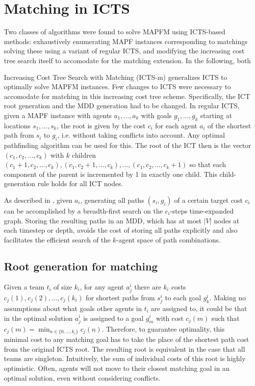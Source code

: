 \documentclass[english]{article}
\begin{document}
	\section{Matching in ICTS} %
	Two classes of algorithms were found to solve MAPFM using ICTS-based methods: exhaustively enumerating MAPF instances corresponding to matchings solving these using a variant of regular ICTS, and modifying the increasing cost tree search itself to accomodate for the matching extension. In the following, both 
	
	
	
	Increasing Cost Tree Search with Matching (ICTS-m) generalizes ICTS to optimally solve MAPFM instances. Few changes to ICTS were necessary to accomodate for matching in this increasing cost tree scheme. Specifically, the ICT root generation and the MDD generation had to be changed. In regular ICTS, given a MAPF instance with agents $a_1,\ldots,a_k$ with goals $g_1,\ldots,g_k$ starting at locations $s_1,\ldots,s_k$, the root is given by the cost $c_i$ for each agent $a_i$ of the shortest path from $s_i$ to $g_i$, i.e. without taking conflicts into account. Any optimal pathfinding algorithm can be used for this. The root of the ICT then is the vector $(c_1,c_2,\ldots,c_k)$ with $k$ children $(c_1 + 1, c_2,\ldots,c_k), (c_1, c_2 + 1,\ldots,c_k),\ldots,(c_1, c_2,\ldots,c_k + 1)$ so that each component of the parent is incremented by 1 in exactly one child. This child-generation rule holds for all ICT nodes. 
	
	As described in \cite{sharon2011}, given $a_i$, generating all paths $(s_i,g_i)$ of a certain target cost $c_i$ can be accomplished by a breadth-first search on the $c_i$-steps time-expanded graph. Storing the resulting paths in an MDD, which has at most $|V|$ nodes at each timestep or depth, avoids the cost of storing all paths explicitly and also facilitates the efficient search of the $k$-agent space of path combinations.
	\subsection{Root generation for matching}
	Given a team $t_i$ of size $k_i$, for any agent $a_j^i$ there are $k_i$ costs $c_j(1),c_j(2),\ldots,c_j(k_i)$ for shortest paths from $s_j^i$ to each goal $g_k^i$. Making no assumptions about what goals other agents in $t_i$ are assigned to, it could be that in the optimal solution $a_j^i$ is assigned to a goal $g_{m}^i$ with cost $c_j(m)$ such that $c_j(m) = \min_{n\in\{0,\ldots,k_i\}} c_j(n)$. Therefore, to guarantee optimality, this minimal cost to any matching goal has to take the place of the shortest path cost from the original ICTS root. The resulting root is equivalent in the case that all teams are singleton. Intuitively, the sum of individual costs of this root is highly optimistic. Often, agents will not move to their closest matching goal in an optimal solution, even without considering conflicts.
	
\end{document}
